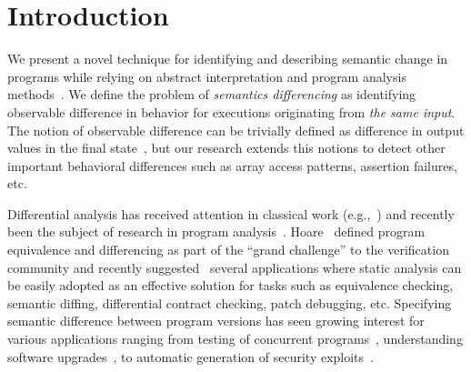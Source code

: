 \section{Introduction} 

We present a novel technique for identifying and describing semantic change in programs while relying on abstract interpretation and program analysis methods~\cite{CousotCousot77}. We define the problem of \emph{semantics differencing} as identifying observable difference in behavior for executions originating from \emph{the same input}. The notion of observable difference can be trivially defined as difference in output values in the final state~\cite{DwyerElbaumPerson08,GodlinStrichman09,EnglerRamos11,HawblitzelKawaguchiLahiriRebelo12}, but our research extends this notions to detect other important behavioral differences such as array access patterns, assertion failures, etc.


Differential analysis has received attention in classical work (e.g.,~\cite{Horwitz90,Horwitz89,JacksonLadd94}) and recently been the subject of research in program analysis~\cite{DwyerElbaumPerson08,GodlinStrichman09,EnglerRamos11,HawblitzelKawaguchiLahiriRebelo12}. Hoare~\cite{Hoare69} defined program equivalence and differencing as part of the ``grand challenge'' to the verification community and recently suggested~\cite{HoareLahiriVaswani10} several applications where static analysis can be easily adopted as an effective solution for tasks such as equivalence checking, semantic diffing, differential contract checking, patch debugging, etc. Specifying semantic difference between program versions has seen growing interest for various applications ranging from testing of concurrent programs~\cite{ChakiGurfinkelStrichman12}, understanding software upgrades~\cite{JinOrsoXie10}, to automatic generation of security exploits~\cite{BrumleyPoosankamSongZheng08}.

